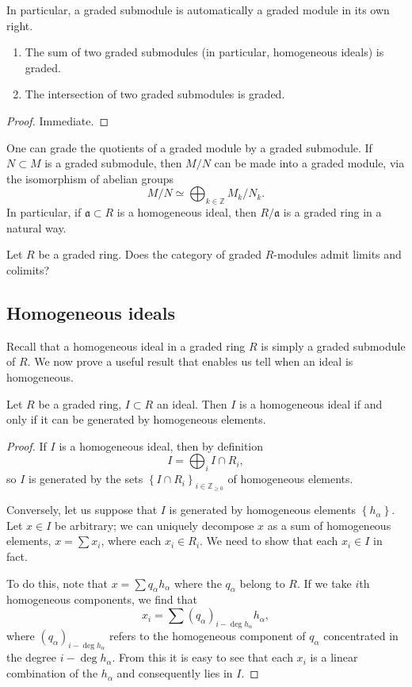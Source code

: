 In particular, a graded submodule is automatically a graded module in its own
right. 

\begin{lemma} 
\begin{enumerate}
\item The sum of two graded submodules (in particular, homogeneous ideals) is
graded.
\item  The intersection of two graded submodules is graded.
\end{enumerate}
\end{lemma} 
\begin{proof} 
Immediate.
\end{proof} 

One can grade the quotients of a graded module by a graded submodule.
If $N \subset M$ is a graded submodule, then $M/N$ can be made into a graded
module,  via the isomorphism of abelian groups
\[  M/N \simeq \bigoplus_{k \in \mathbb{Z}} M_k/N_k.  \]
In particular, if $\mathfrak{a} \subset R$ is a homogeneous ideal, then 
$R/\mathfrak{a}$ is a graded ring in a natural way.


\begin{exercise} 
Let $R$ be a graded ring. Does the category of graded $R$-modules admit limits and colimits?
\end{exercise} 
\subsection{Homogeneous ideals}

Recall that a homogeneous ideal in a graded ring $R$ is simply a graded
submodule of $R$. We now prove a useful result that enables us tell when an
ideal is homogeneous.

\begin{proposition} \label{homgideal}
Let $R$ be a graded ring, $I \subset R$ an ideal. Then $I$ is a homogeneous
ideal 
if and only if it can be generated by homogeneous elements.
\end{proposition} 
\begin{proof} 
If $I$ is a homogeneous ideal, then by definition
\[ I = \bigoplus_i I \cap R_i,  \]
so $I$ is generated by the sets $\left\{I \cap R_i\right\}_{i \in
\mathbb{Z}_{\geq 0}}$ of homogeneous elements. 

Conversely, let us suppose that $I$ is generated by homogeneous elements
$\left\{h_\alpha\right\}$. Let $x \in I$ be arbitrary; we can uniquely
decompose $x$ as a sum of homogeneous elements, $x = \sum x_i$, where each
$x_i \in R_i$. We need to show that each $x_i \in I$ in fact.

To do this, note that $x = \sum q_\alpha h_\alpha$ where the $q_\alpha $
belong to $R$. If we take $i$th homogeneous components, we find that
\[ x_i = \sum ( q_{\alpha})_{i - \deg h_\alpha} h_\alpha, \]
where $(q_\alpha)_{i - \deg h_\alpha}$ refers to the homogeneous component of $q_\alpha$
concentrated in the degree $i - \deg h_\alpha$.
From this it is easy to see that each $x_i$ is a linear combination of the
$h_\alpha$ and consequently lies in $I$.
\end{proof} 

